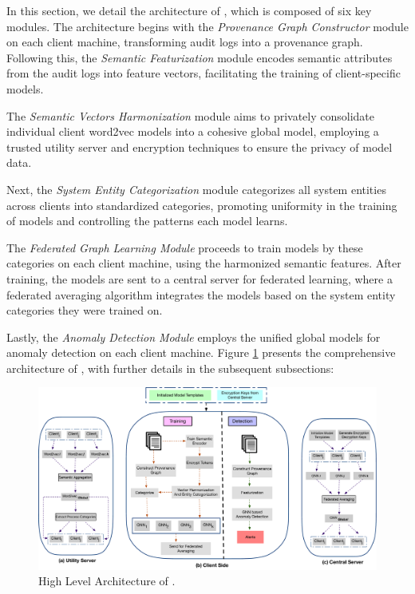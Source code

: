 In this section, we detail the architecture of \Sys, which is composed of six key modules. The architecture begins with the \textit{Provenance Graph Constructor} module on each client machine, transforming audit logs into a provenance graph. Following this, the \textit{Semantic Featurization} module encodes semantic attributes from the audit logs into feature vectors, facilitating the training of client-specific \gnnshort models.

The \textit{Semantic Vectors Harmonization} module aims to privately consolidate individual client word2vec models into a cohesive global model, employing a trusted utility server and encryption techniques to ensure the privacy of model data.

Next, the \textit{System Entity Categorization} module categorizes all system entities across clients into standardized categories, promoting uniformity in the training of \gnnshort models and controlling the patterns each model learns.

The \textit{Federated Graph Learning Module} proceeds to train \gnnshort models by these categories on each client machine, using the harmonized semantic features. After training, the models are sent to a central server for federated learning, where a federated averaging algorithm integrates the models based on the system entity categories they were trained on.

Lastly, the \textit{Anomaly Detection Module} employs the unified global models for anomaly detection on each client machine. Figure \ref{fig:arch} presents the comprehensive architecture of \Sys, with further details in the subsequent subsections:


\begin{figure}[t!]
  \centering
  \includegraphics[width=\textwidth]{fig/archv2.pdf}
  \caption{High Level Architecture of \Sys.}
  \vspace{-3ex}
  \label{fig:arch}
\end{figure}


